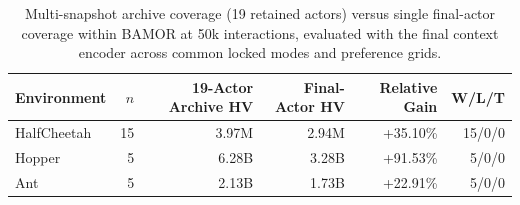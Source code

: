 \begin{table}[!htbp]
\centering\small\setlength{\tabcolsep}{4.5pt}
\caption{Multi-snapshot archive coverage (19 retained actors) versus single final-actor coverage within BAMOR at 50k interactions, evaluated with the final context encoder across common locked modes and preference grids.}
\label{tab:matched_archive}
\begin{tabular}{@{}lrrrrr@{}}
\toprule
Environment & $n$ & 19-Actor Archive HV & Final-Actor HV & Relative Gain & W/L/T \\
\midrule
HalfCheetah & 15 & 3.97M & 2.94M & +35.10\% & 15/0/0 \\
Hopper & 5 & 6.28B & 3.28B & +91.53\% & 5/0/0 \\
Ant & 5 & 2.13B & 1.73B & +22.91\% & 5/0/0 \\
\bottomrule
\end{tabular}
\end{table}
